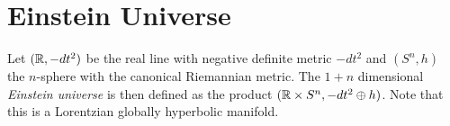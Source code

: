 

\section{Einstein Universe}

\begin{definition}
Let $(\mathbb{R},-dt^2)$ be the real line with negative definite metric $-dt^2$ and $(S^n,h)$ the $n$-sphere with the canonical Riemannian metric. The $1+n$ dimensional \emph{Einstein universe} is then defined as the product $(\mathbb{R}\times S^n, -dt^2 \oplus h)$. Note that this is a Lorentzian globally hyperbolic manifold.
\end{definition}


